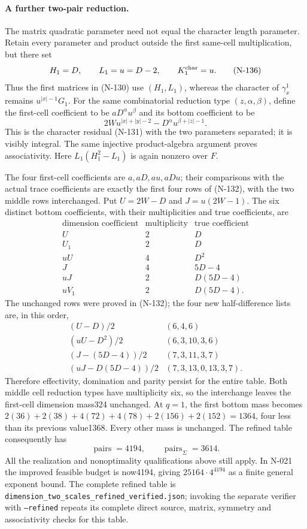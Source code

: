 \paragraph{A further two-pair reduction.}
The matrix quadratic parameter need not equal the character length
parameter.  Retain every parameter and product outside the first
same-cell multiplication, but there set
\[
 H_1=D,\qquad L_1=u=D-2,\qquad K_1^{\rm char}=u.
 \tag{N-136}
\]
Thus the first matrices in (N-130) use $(H_1,L_1)$, whereas the
character of $\gamma^1_x$ remains $u^{|x|-1}G_1$.
For the same combinatorial reduction type $(z,\alpha,\beta)$, define
the first-cell coefficient to be $aD^\alpha u^\beta$ and its bottom
coefficient to be
\[
 2W u^{|x|+|y|-2}-D^\alpha u^{\beta+|z|-1}.
 \tag{N-137}
\]
This is the character residual (N-131) with the two parameters
separated; it is visibly integral.  The same injective product-algebra
argument proves associativity.  Here $L_1(H_1^2-L_1)$ is again nonzero
over $F$.

The four first-cell coefficients are $a,aD,au,aDu$;
their comparisons with the actual trace coefficients are exactly
the first four rows of (N-132), with the two middle rows interchanged.
Put $U=2W-D$ and $J=u(2W-1)$.  The six distinct bottom coefficients,
with their multiplicities and true coefficients, are
\[
\begin{array}{c|r|c}
\text{dimension coefficient}&\text{multiplicity}&\text{true coefficient}\\\hline
U&2&D\\
U_1&2&D\\
uU&4&D^2\\
J&4&5D-4\\
uJ&2&D(5D-4)\\
uV_1&2&D(5D-4).
\end{array}
\]
The unchanged rows were proved in (N-132); the four new
half-difference lists are, in this order,
\[
\begin{array}{c|l}
(U-D)/2&(6,4,6)\\
(uU-D^2)/2&(6,3,10,3,6)\\
(J-(5D-4))/2&(7,3,11,3,7)\\
(uJ-D(5D-4))/2&(7,3,13,0,13,3,7).
\end{array}
\]
Therefore effectivity, domination and parity persist for the entire
table.  Both middle cell reduction types have multiplicity six, so
the interchange leaves the first-cell dimension mass324 unchanged.
At $q=1$, the first bottom mass becomes
$2(36)+2(38)+4(72)+4(78)+2(156)+2(152)=1364$,
four less than its previous value1368.  Every other mass is unchanged.
The refined table consequently has
\[
 \boxed{\operatorname{pairs}=4194},\qquad
 \boxed{\operatorname{pairs}_{\Sigma}=3614}.
 \tag{N-138}
\]
All the realization and nonoptimality qualifications above still
apply.  In N-021 the improved feasible budget is now4194, giving
$25164\cdot4^{4194}$ as a finite general exponent bound.
The complete refined table is
\nolinkurl{dimension_two_scales_refined_verified.json}; invoking the
separate verifier with \texttt{--refined} repeats its complete direct
source, matrix, symmetry and associativity checks for this table.

